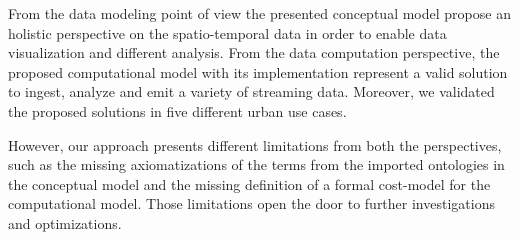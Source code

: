 From the data modeling point of view the presented conceptual model propose an holistic perspective on the spatio-temporal data in order to enable data visualization and different analysis.
From the data computation perspective, the proposed computational model with its implementation represent a valid solution to ingest, analyze and emit a variety of streaming data.
Moreover, we validated the proposed solutions in five different urban use cases.

However, our approach presents different limitations from both the perspectives, such as the missing axiomatizations of the terms from the imported ontologies in the conceptual model and the missing definition of a formal cost-model for the computational model.
Those limitations open the door to further investigations and optimizations.
